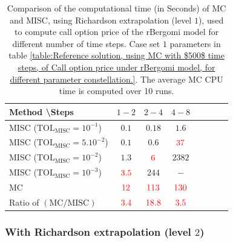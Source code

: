 \begin{table}[h!]
	\centering
	\begin{tabular}{l*{6}{c}r}
		Method \textbackslash  Steps            & $1-2$ & $2-4$ & $4-8$   \\
		\hline
		MISC ($\text{TOL}_{\text{MISC}}=10^{-1}$)  & $0.1$ & $0.18$ & $1.6$  \\
		MISC ($\text{TOL}_{\text{MISC}}=5.10^{-2}$)  & $0.1$ & $0.6$ & ${\color{red}37}$  \\
		MISC ($\text{TOL}_{\text{MISC}}=10^{-2}$)  & $1.3$ & ${\color{red}6}$ & $2382$  \\
		MISC ($\text{TOL}_{\text{MISC}}=10^{-3}$)  & ${\color{red}3.5}$ & $ 244$ & $-$   \\
		
		\hline	
		MC  &${\color{red}12}$ & ${\color{red}113}$  & ${\color{red}130}$   \\
		
		\hline	
		Ratio of $\left(\text{MC}/ \text{MISC} \right)$  &${\color{red} 3.4
		}$ & ${\color{red}     18.8
		}$  & ${\color{red} 3.5}
		$  \\
		\hline
		\end{tabular}
		\caption{Comparison of the computational time (in Seconds) of  MC and MISC, using Richardson extrapolation (level $1$), used to compute call option price of the rBergomi model for different number of time steps. Case set $1$ parameters in table \ref{table:Reference solution, using MC with $500$ time steps, of Call option price under rBergomi model, for different parameter constellation.}. The
			average MC CPU time is computed over 10 runs.}
		\label{Comparsion of the computational time of  MC and MISC, using Richardson extrapolation (level $1$), used to compute Call option price of rBergomi model for different number of time steps. Case set $2$ parameters,linear}
		\end{table}
		
		\FloatBarrier
	\subsubsection*{With Richardson extrapolation (level $2$)}
		
